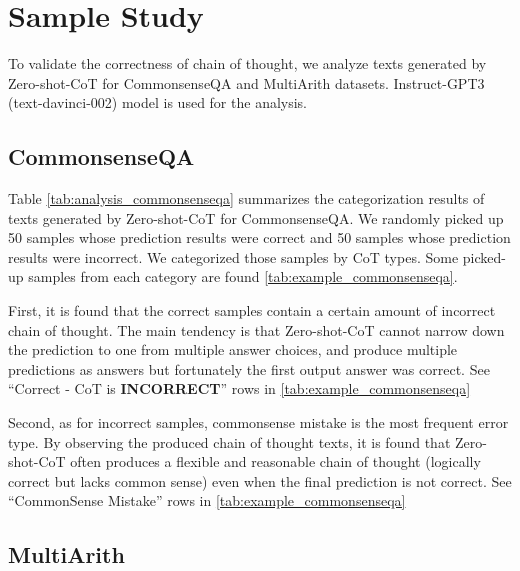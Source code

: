 \documentclass{article}
\newcommand{\CoT}{chain of thought\xspace}
\newcommand{\ours}{Zero-shot-CoT\xspace}
\begin{document}





\clearpage


\clearpage
\section{Sample Study}
\label{appx:error_analysis}

To validate the correctness of \CoT, we analyze texts generated by \ours for CommonsenseQA and MultiArith datasets. Instruct-GPT3 (text-davinci-002) model is used for the analysis.

\subsection{CommonsenseQA}



Table \ref{tab:analysis_commonsenseqa} summarizes the categorization results of texts generated by \ours for CommonsenseQA. We randomly picked up 50 samples whose prediction results were correct and 50 samples whose prediction results were incorrect. We categorized those samples by CoT types. Some picked-up samples from each category are found \autoref{tab:example_commonsenseqa}. 

First, it is found that the correct samples contain a certain amount of incorrect \CoT. The main tendency is that \ours cannot narrow down the prediction to one from multiple answer choices, and produce multiple predictions as answers but fortunately the first output answer was correct. See ``Correct - CoT is \textbf{INCORRECT}'' rows in \autoref{tab:example_commonsenseqa}

Second, as for incorrect samples, commonsense mistake is the most frequent error type. By observing the produced \CoT texts, it is found that \ours often produces a flexible and reasonable chain of thought (logically correct but lacks common sense) even when the final prediction is not correct. See ``CommonSense Mistake'' rows in \autoref{tab:example_commonsenseqa}



\subsection{MultiArith}


\end{document}
